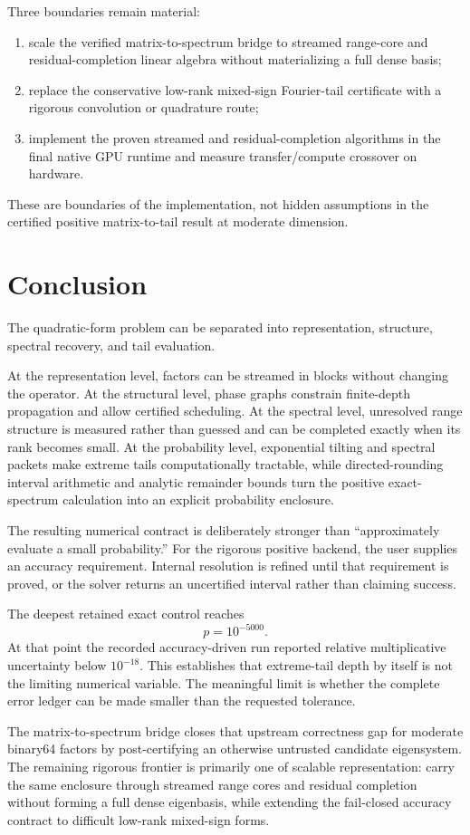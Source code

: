 Three boundaries remain material:

\begin{enumerate}
\item scale the verified matrix-to-spectrum bridge to streamed range-core and
residual-completion linear algebra without materializing a full dense basis;
\item replace the conservative low-rank mixed-sign Fourier-tail certificate
with a rigorous convolution or quadrature route;
\item implement the proven streamed and residual-completion algorithms in the
final native GPU runtime and measure transfer/compute crossover on hardware.
\end{enumerate}

These are boundaries of the implementation, not hidden assumptions in the
certified positive matrix-to-tail result at moderate dimension.



\section{Conclusion}\label{sec:final-32}

The quadratic-form problem can be separated into representation, structure,
spectral recovery, and tail evaluation.

At the representation level, factors can be streamed in blocks without
changing the operator.  At the structural level, phase graphs constrain
finite-depth propagation and allow certified scheduling.  At the spectral
level, unresolved range structure is measured rather than guessed and can be
completed exactly when its rank becomes small.  At the probability level,
exponential tilting and spectral packets make extreme tails computationally
tractable, while directed-rounding interval arithmetic and analytic remainder
bounds turn the positive exact-spectrum calculation into an explicit
probability enclosure.

The resulting numerical contract is deliberately stronger than
``approximately evaluate a small probability.''  For the rigorous positive
backend, the user supplies an accuracy requirement.  Internal resolution is
refined until that requirement is proved, or the solver returns an
uncertified interval rather than claiming success.

The deepest retained exact control reaches
\[
p=10^{-5000}.
\]
At that point the recorded accuracy-driven run reported relative multiplicative
uncertainty below \(10^{-18}\).  This establishes that extreme-tail depth by
itself is not the limiting numerical variable. The meaningful limit is whether
the complete error ledger can be made smaller than the requested tolerance.

The matrix-to-spectrum bridge closes that upstream correctness gap for
moderate binary64 factors by post-certifying an otherwise untrusted candidate
eigensystem.  The remaining rigorous frontier is primarily one of scalable
representation: carry the same enclosure through streamed range cores and
residual completion without forming a full dense eigenbasis, while extending
the fail-closed accuracy contract to difficult low-rank mixed-sign forms.




